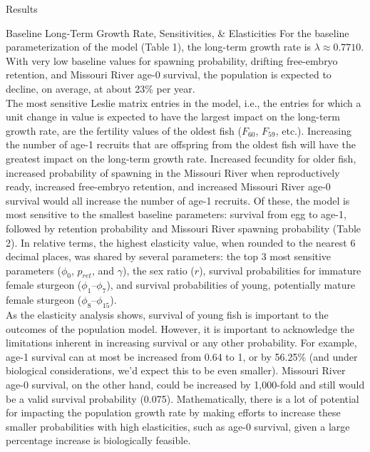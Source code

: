 \documentclass[12pt]{article}
\begin{document}
\begin{section}{Results}
\begin{subsection}{Baseline Long-Term Growth Rate, Sensitivities, \& Elasticities}
For the baseline parameterization of the model (Table 1), the long-term growth rate is $\lambda\approx 0.7710$.  With very low baseline values for spawning probability, drifting free-embryo retention, and Missouri River age-0 survival, the population is expected to decline, on average, at about 23\% per year.\\  

The most sensitive Leslie matrix entries in the model, i.e., the entries for which a unit change in value is expected to have the largest impact on the long-term growth rate, are the fertility values of the oldest fish ($F_{60}$, $F_{59}$, etc.).  Increasing the number of age-1 recruits that are offspring from the oldest fish will have the greatest impact on the long-term growth rate.  Increased fecundity for older fish, increased probability of spawning in the Missouri River when reproductively ready, increased free-embryo retention, and increased Missouri River age-0 survival would all increase the number of age-1 recruits.  Of these, the model is most sensitive to the smallest baseline parameters:  survival from egg to age-1, followed by retention probability and Missouri River spawning probability (Table 2).  In relative terms, the highest elasticity value, when rounded to the nearest 6 decimal places, was shared by several parameters:  the top 3 most sensitive parameters ($\phi_0$, $p_{ret}$, and $\gamma$), the sex ratio ($r$), survival probabilities for immature female sturgeon ($\phi_1$--$\phi_{7}$), and survival probabilities of young, potentially mature female sturgeon ($\phi_{8}$--$\phi_{15}$).\\

As the elasticity analysis shows, survival of young fish is important to the outcomes of the population model.  However, it is important to acknowledge the limitations inherent in increasing survival or any other probability.  For example, age-1 survival can at most be increased from 0.64 to 1, or by 56.25\% (and under biological considerations, we'd expect this to be even smaller).  Missouri River age-0 survival, on the other hand, could be increased by 1,000-fold and still would be a valid survival probability (0.075).  Mathematically, there is a lot of potential for impacting the population growth rate by making efforts to increase these smaller probabilities with high elasticities, such as age-0 survival, given a large percentage increase is biologically feasible.      
\end{subsection}



\end{section}
\end{document}
